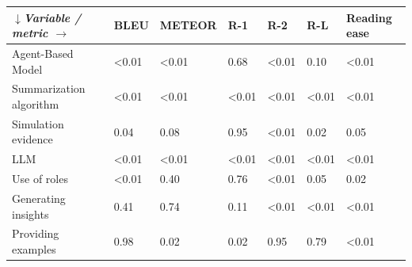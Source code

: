 \begin{tabular}{|l|l|l|l|l|l|l|}
\hline
\textit{$\downarrow$Variable / metric $\rightarrow$} & BLEU & METEOR & R-1 & R-2 & R-L & Reading ease \\
 \hline
 Agent-Based Model & \textless{}0.01 & \textless{}0.01 & 0.68 & \textless{}0.01 & 0.10 & \textless{}0.01 \\
 \hline
 Summarization algorithm & \textless{}0.01 & \textless{}0.01 & \textless{}0.01 & \textless{}0.01 & \textless{}0.01 & \textless{}0.01 \\
 \hline
 Simulation evidence & 0.04 & 0.08 & 0.95 & \textless{}0.01 & 0.02 & 0.05 \\
 \hline
 LLM & \textless{}0.01 & \textless{}0.01 & \textless{}0.01 & \textless{}0.01 & \textless{}0.01 & \textless{}0.01 \\
 \hline
 Use of roles & \textless{}0.01 & 0.40 & 0.76 & \textless{}0.01 & 0.05 & 0.02 \\
 \hline
 Generating insights & 0.41 & 0.74 & 0.11 & \textless{}0.01 & \textless{}0.01 & \textless{}0.01 \\
 \hline
 Providing examples & 0.98 & 0.02 & 0.02 & 0.95 & 0.79 & \textless{}0.01 \\
\hline
\end{tabular}
